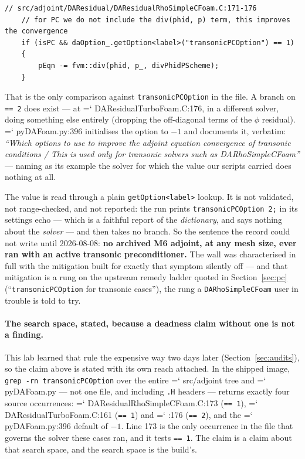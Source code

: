 \documentclass[11pt,a4paper]{article}
\newcommand{\artifact}[1]{{\small\ttfamily\hyphenchar\font=`\-\relax
  \def\_{\textunderscore\allowbreak}#1}}
\begin{document}
\begin{lstlisting}
// src/adjoint/DAResidual/DAResidualRhoSimpleCFoam.C:171-176
    // for PC we do not include the div(phid, p) term, this improves the convergence
    if (isPC && daOption_.getOption<label>("transonicPCOption") == 1)
    {
        pEqn -= fvm::div(phid, p_, divPhidPScheme);
    }
\end{lstlisting}

That is the only comparison against \texttt{transonicPCOption} in the file. A branch on
\texttt{== 2} does exist --- at \artifact{DAResidualTurboFoam.C:176}, in a different solver,
doing something else entirely (dropping the off-diagonal terms of the \(\phi\) residual).
\artifact{pyDAFoam.py:396} initialises the option to \(-1\) and documents it, verbatim:
\emph{``Which options to use to improve the adjoint equation convergence of transonic
conditions / This is used only for transonic solvers such as DARhoSimpleCFoam''} --- naming as
its example the solver for which the value our scripts carried does nothing at all.

The value is read through a plain \texttt{getOption<label>} lookup. It is not validated, not
range-checked, and not reported: the run prints \texttt{transonicPCOption 2;} in its settings
echo --- which is a faithful report of the \emph{dictionary}, and says nothing about the
\emph{solver} --- and then takes no branch. So the sentence the record could not write until
2026-08-08: \textbf{no archived M6 adjoint, at any mesh size, ever ran with an active
transonic preconditioner.} The wall was characterised in full with the mitigation built for
exactly that symptom silently off --- and that mitigation is a rung on the upstream remedy
ladder quoted in Section~\ref{sec:pc} (``\texttt{transonicPCOption} for transonic cases''),
the rung a \texttt{DARhoSimpleCFoam} user in trouble is told to try.

\paragraph{The search space, stated, because a deadness claim without one is not a finding.}
This lab learned that rule the expensive way two days later (Section~\ref{sec:audits}), so the
claim above is stated with its own reach attached. In the shipped image,
\texttt{grep -rn transonicPCOption} over the entire \artifact{src/adjoint} tree and
\artifact{pyDAFoam.py} --- not one file, and including \texttt{.H} headers --- returns exactly
four source occurrences: \artifact{DAResidualRhoSimpleCFoam.C:173} (\texttt{== 1}),
\artifact{DAResidualTurboFoam.C:161} (\texttt{== 1}) and \artifact{:176} (\texttt{== 2}), and
the \artifact{pyDAFoam.py:396} default of \(-1\). Line 173 is the only occurrence in the file
that governs the solver these cases ran, and it tests \texttt{== 1}. The claim is a claim about
that search space, and the search space is the build's.
\end{document}
